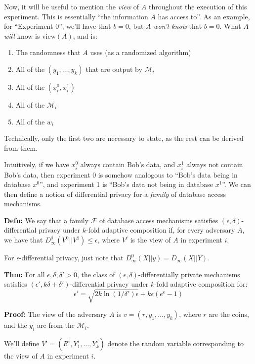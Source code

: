 \documentclass{article}
\theoremstyle{definition}
\begin{document}
Now, it will be useful to mention the \emph{view} of $A$ throughout the execution of this experiment.
This is essentially ``the information $A$ has access to''.
As an example, for ``Experiment $0$'', we'll have that $b = 0$, but $A$ \emph{won't know} that $b = 0$.
What $A$ \emph{will} know is $\text{view}(A)$, and is:
\begin{enumerate}
\item The randomness that $A$ uses (as a randomized algorithm)
\item All of the $(y_1,\dots,y_k)$ that are output by $\mathcal{M}_i$
\item All of the $(x_i^0,x_i^1)$
\item All of the $\mathcal{M}_i$
\item All of the $w_i$
\end{enumerate}
Technically, only the first two are necessary to state, as the rest can be derived from them.

Intuitively, if we have $x_i^0$ always contain Bob's data, and $x_i^1$ always not contain Bob's data, then experiment 0 is somehow analogous to ``Bob's data being in database $x^0$'', and experiment 1 is ``Bob's data not being in database $x^1$''.
We can then define a notion of differential privacy for a \emph{family} of database access mechanisms.

\textbf{Defn:}
We say that a family $\mathcal{F}$ of database access mechanisms satisfies $(\epsilon,\delta)$-differential privacy under $k$-fold adaptive composition if, for every adversary $A$, we have that $D^\delta_\infty (V^0||V^1)\leq \epsilon$, where $V^i$ is the view of $A$ in experiment $i$.

For $\epsilon$-differential privacy, just note that $D^0_\infty(X||y) = D_\infty (X||Y)$.

\textbf{Thm: }
For all $\epsilon,\delta,\delta'>0$, the class of $(\epsilon,\delta)$-differentially private mechanisms satisfies $(\epsilon',k\delta+\delta')$-differential privacy under $k$-fold adaptive composition for:
\begin{equation}
\epsilon' = \sqrt{2k\ln(1/\delta')\epsilon} + k\epsilon(e^\epsilon - 1)
\end{equation}

\textbf{Proof: }
The view of the adversary $A$ is $v = (r,y_1,\dots,y_k)$, where $r$ are the coins, and the $y_i$ are from the $\mathcal{M}_i$.

We'll define $V^i  = (R^i,Y_1^i,\dots,Y_k^i)$ denote the random variable corresponding to the view of $A$ in experiment $i$.
\end{document}
